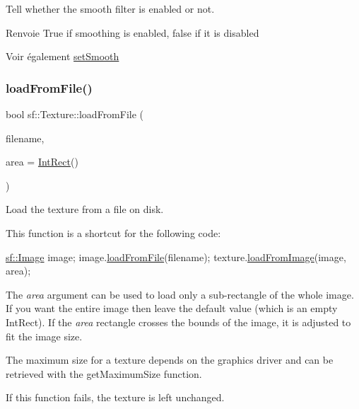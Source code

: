 Tell whether the smooth filter is enabled or not. 

\begin{DoxyReturn}{Renvoie}
True if smoothing is enabled, false if it is disabled
\end{DoxyReturn}
\begin{DoxySeeAlso}{Voir également}
\hyperlink{classsf_1_1Texture_a0c3bd6825b9a99714f10d44179d74324}{set\+Smooth} 
\end{DoxySeeAlso}
\mbox{\label{classsf_1_1Texture_a8e1b56eabfe33e2e0e1cb03712c7fcc7}} 
\subsubsection{\texorpdfstring{load\+From\+File()}{loadFromFile()}}
{\footnotesize\ttfamily bool sf\+::\+Texture\+::load\+From\+File (\begin{DoxyParamCaption}\item[{const std\+::string \&}]{filename,  }\item[{const \hyperlink{classsf_1_1Rect}{Int\+Rect} \&}]{area = {\ttfamily \hyperlink{classsf_1_1Rect}{Int\+Rect}()} }\end{DoxyParamCaption})}



Load the texture from a file on disk. 

This function is a shortcut for the following code\+: 
\begin{DoxyCode}
\hyperlink{classsf_1_1Image}{sf::Image} image;
image.\hyperlink{classsf_1_1Image_a9e4f2aa8e36d0cabde5ed5a4ef80290b}{loadFromFile}(filename);
texture.\hyperlink{classsf_1_1Texture_abec4567ad9856a3596dc74803f26fba2}{loadFromImage}(image, area);
\end{DoxyCode}


The {\itshape area} argument can be used to load only a sub-\/rectangle of the whole image. If you want the entire image then leave the default value (which is an empty Int\+Rect). If the {\itshape area} rectangle crosses the bounds of the image, it is adjusted to fit the image size.

The maximum size for a texture depends on the graphics driver and can be retrieved with the get\+Maximum\+Size function.

If this function fails, the texture is left unchanged.


